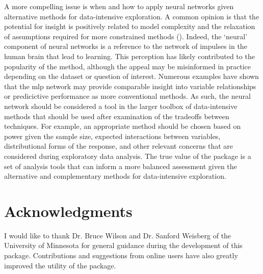 \documentclass[article,shortnames]{jss}\usepackage[]{graphicx}\usepackage[]{color}
\begin{document}
A more compelling issue is when and how to apply neural networks given alternative methods for data-intensive exploration.  A common opinion is that the potential for insight is positively related to model complexity and the relaxation of assumptions required for more constrained methods ().  Indeed, the `neural' component of neural networks is a reference to the network of impulses in the human brain that lead to learning.  This perception has likely contributed to the popularity of the method, although the appeal may be misinformed in practice depending on the dataset or question of interest.  Numerous examples have shown that the \ac{mlp} network may provide comparable insight into variable relationships or predicictive performance as more conventional methods.  As such, the neural network should be considered a tool in the larger toolbox of data-intensive methods that should be used after examination of the tradeoffs between techniques.  For example, an appropriate method should be chosen based on power given the sample size, expected interactions between variables, distributional forms of the response, and other relevant concerns that are considered during exploratory data analysis.  The true value of the  package is a set of analysis tools that can inform a more balanced assessment given the alternative and complementary methods for data-intensive exploration.

\section[Acknowledgments]{Acknowledgments}
 
I would like to thank Dr. Bruce Wilson and Dr. Sanford Weisberg of the University of Minnesota for general guidance during the development of this package.  Contributions and suggestions from online users have also greatly improved the utility of the package.    



\end{document}
